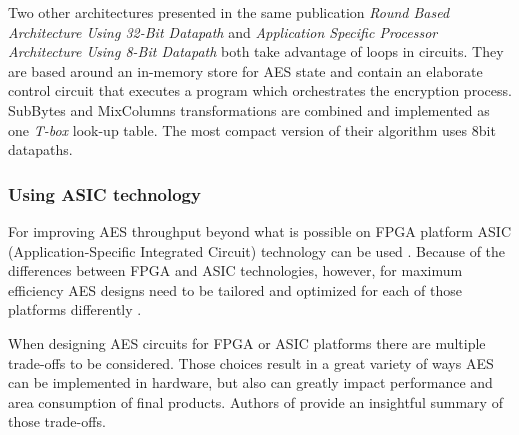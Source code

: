 Two other architectures presented in the same publication \textit{Round Based Architecture Using 32-Bit Datapath} and \textit{Application Specific Processor Architecture Using 8-Bit Datapath} \cite[Sections 2.2, 2.3]{good2005aes} both take advantage of loops in circuits. They are based around an in-memory store for AES state and contain an elaborate control circuit that executes a program which orchestrates the encryption process. SubBytes and MixColumns transformations are combined and implemented as one \textit{T-box} look-up table. The most compact version of their algorithm uses 8bit datapaths.










\subsubsection{Using ASIC technology}
For improving AES throughput beyond what is possible on FPGA platform ASIC (Application-Specific Integrated Circuit) technology can be used \cite{kuon2007measuring, gaj2009fpga}. Because of the differences between FPGA and ASIC technologies, however, for maximum efficiency AES designs need to be tailored and optimized for each of those platforms differently \cite{pramstaller2004efficient, gaj2009fpga}.

When designing AES circuits for FPGA or ASIC platforms there are multiple trade-offs to be considered. Those choices result in a great variety of ways AES can be implemented in hardware, but also can greatly impact performance and area consumption of final products. Authors of \cite{standaert2003efficient} provide an insightful summary of those trade-offs.




